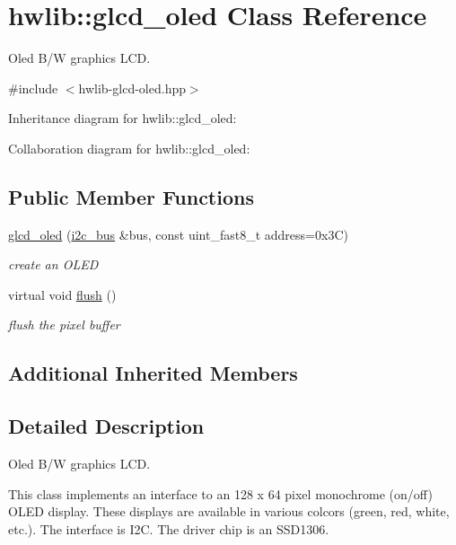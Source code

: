 \hypertarget{classhwlib_1_1glcd__oled}{}\section{hwlib\+:\+:glcd\+\_\+oled Class Reference}
\label{classhwlib_1_1glcd__oled}


Oled B/W graphics L\+CD.  




{\ttfamily \#include $<$hwlib-\/glcd-\/oled.\+hpp$>$}



Inheritance diagram for hwlib\+:\+:glcd\+\_\+oled\+:


Collaboration diagram for hwlib\+:\+:glcd\+\_\+oled\+:
\subsection*{Public Member Functions}
\begin{DoxyCompactItemize}
\item 
\hyperlink{classhwlib_1_1glcd__oled_a263ff5913c63771b23ec6b64c4bf77e1}{glcd\+\_\+oled} (\hyperlink{classhwlib_1_1i2c__bus}{i2c\+\_\+bus} \&bus, const uint\+\_\+fast8\+\_\+t address=0x3\+C)
\begin{DoxyCompactList}\small\item\em create an O\+L\+ED \end{DoxyCompactList}\item 
virtual void \hyperlink{classhwlib_1_1glcd__oled_a58e191e5350f349facee130513a08b75}{flush} ()
\begin{DoxyCompactList}\small\item\em flush the pixel buffer \end{DoxyCompactList}\end{DoxyCompactItemize}
\subsection*{Additional Inherited Members}


\subsection{Detailed Description}
Oled B/W graphics L\+CD. 

This class implements an interface to an 128 x 64 pixel monochrome (on/off) O\+L\+ED display. These displays are available in various colcors (green, red, white, etc.). The interface is I2C. The driver chip is an S\+S\+D1306.

